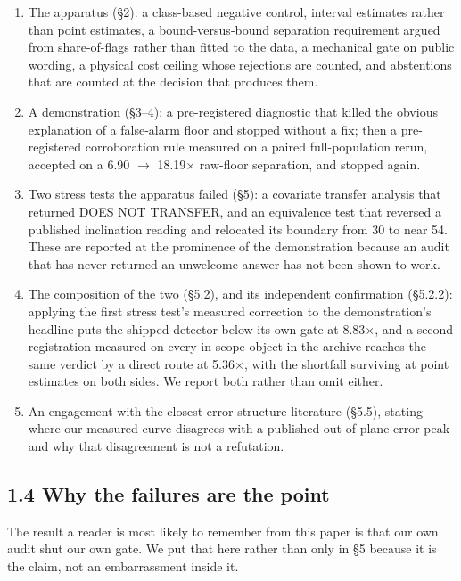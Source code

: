 \documentclass[11pt]{article}
\begin{document}
\begin{enumerate}
\item[1.] The apparatus (\S{}2): a class-based negative control, interval estimates rather than point estimates, a bound-versus-bound separation requirement argued from share-of-flags rather than fitted to the data, a mechanical gate on public wording, a physical cost ceiling whose rejections are counted, and abstentions that are counted at the decision that produces them.
\item[2.] A demonstration (\S{}3--4): a pre-registered diagnostic that killed the obvious explanation of a false-alarm floor and stopped without a fix; then a pre-registered corroboration rule measured on a paired full-population rerun, accepted on a 6.90 $\rightarrow$ 18.19$\times$ raw-floor separation, and stopped again.
\item[3.] Two stress tests the apparatus failed (\S{}5): a covariate transfer analysis that returned DOES NOT TRANSFER, and an equivalence test that reversed a published inclination reading and relocated its boundary from 30\textdegree{} to near 54\textdegree{}. These are reported at the prominence of the demonstration because an audit that has never returned an unwelcome answer has not been shown to work.
\item[4.] The composition of the two (\S{}5.2), and its independent confirmation (\S{}5.2.2): applying the first stress test's measured correction to the demonstration's headline puts the shipped detector below its own gate at 8.83$\times$, and a second registration measured on every in-scope object in the archive reaches the same verdict by a direct route at 5.36$\times$, with the shortfall surviving at point estimates on both sides. We report both rather than omit either.
\item[5.] An engagement with the closest error-structure literature (\S{}5.5), stating where our measured curve disagrees with a published out-of-plane error peak and why that disagreement is not a refutation.
\end{enumerate}

\subsection*{1.4 Why the failures are the point}

The result a reader is most likely to remember from this paper is that our own audit shut our own gate. We put that here rather than only in \S{}5 because it is the claim, not an embarrassment inside it.
\end{document}
